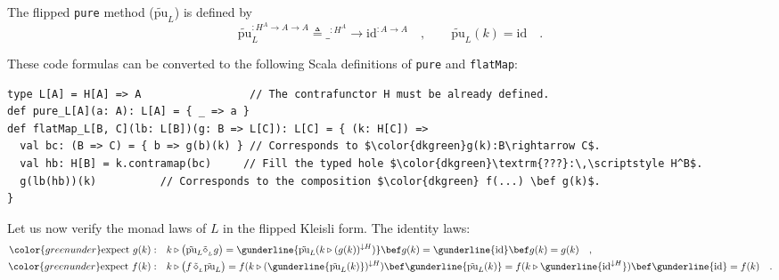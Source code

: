 The flipped \lstinline!pure! method ($\tilde{\text{pu}}_{L}$) is
defined by
\begin{equation}
\tilde{\text{pu}}_{L}^{:H^{A}\rightarrow A\rightarrow A}\triangleq\_^{:H^{A}}\rightarrow\text{id}^{:A\rightarrow A}\quad,\quad\quad\tilde{\text{pu}}_{L}(k)=\text{id}\quad.\label{eq:def-of-pure-for-exp-construction-h-a-a}
\end{equation}

These code formulas can be converted to the following Scala definitions
of \lstinline!pure! and \lstinline!flatMap!:
\begin{lstlisting}[mathescape=true]
type L[A] = H[A] => A                 // The contrafunctor H must be already defined.
def pure_L[A](a: A): L[A] = { _ => a }
def flatMap_L[B, C](lb: L[B])(g: B => L[C]): L[C] = { (k: H[C]) =>
  val bc: (B => C) = { b => g(b)(k) } // Corresponds to $\color{dkgreen}g(k):B\rightarrow C$.
  val hb: H[B] = k.contramap(bc)     // Fill the typed hole $\color{dkgreen}\textrm{???}:\,\scriptstyle H^B$.
  g(lb(hb))(k)          // Corresponds to the composition $\color{dkgreen} f(...) \bef g(k)$.
}
\end{lstlisting}

Let us now verify the monad laws of $L$ in the flipped Kleisli form.
The identity laws:
\begin{align*}
{\color{greenunder}\text{expect }g(k):}\quad & k\triangleright\big(\tilde{\text{pu}}_{L}\tilde{\diamond}_{_{L}}g\big)=\gunderline{\tilde{\text{pu}}_{L}(k\triangleright(g(k))^{\downarrow H})}\bef g(k)=\gunderline{\text{id}}\bef g(k)=g(k)\quad,\\
{\color{greenunder}\text{expect }f(k):}\quad & k\triangleright\big(f\,\tilde{\diamond}_{_{L}}\tilde{\text{pu}}_{L}\big)=f(k\triangleright(\gunderline{\tilde{\text{pu}}_{L}(k)})^{\downarrow H})\bef\gunderline{\tilde{\text{pu}}_{L}(k)}=f(k\triangleright\gunderline{\text{id}^{\downarrow H}})\bef\gunderline{\text{id}}=f(k)\quad.
\end{align*}

